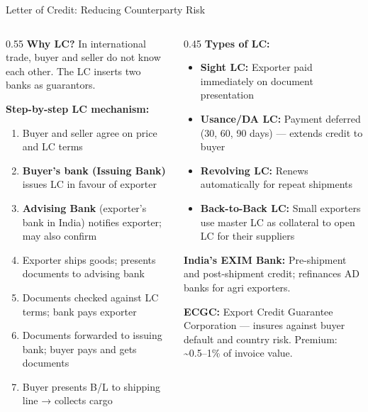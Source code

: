 \documentclass[
  ignorenonframetext,
  aspectratio=169,
]{beamer}
\makeatletter
\providecommand{\tightlist}{%
  \setlength{\itemsep}{0pt}\setlength{\parskip}{0pt}}
\let\quarto@originallabel\label
\DeclareRobustCommand*{\label}[1]{\quarto@originallabel{#1}}
\makeatother
\begin{document}
\begin{frame}
\begin{block}{Letter of Credit: Reducing Counterparty Risk}
\label{letter-of-credit-reducing-counterparty-risk}
\begin{columns}[T]
\begin{column}{0.55\linewidth}
\textbf{Why LC?} In international trade, buyer and seller do not know
each other. The LC inserts two banks as guarantors.

\textbf{Step-by-step LC mechanism:}

\begin{enumerate}
\tightlist
\item
  Buyer and seller agree on price and LC terms
\item
  \textbf{Buyer's bank (Issuing Bank)} issues LC in favour of exporter
\item
  \textbf{Advising Bank} (exporter's bank in India) notifies exporter;
  may also confirm
\item
  Exporter ships goods; presents documents to advising bank
\item
  Documents checked against LC terms; bank pays exporter
\item
  Documents forwarded to issuing bank; buyer pays and gets documents
\item
  Buyer presents B/L to shipping line → collects cargo
\end{enumerate}
\end{column}

\begin{column}{0.45\linewidth}
\textbf{Types of LC:}

\begin{itemize}
\tightlist
\item
  \textbf{Sight LC:} Exporter paid immediately on document presentation
\item
  \textbf{Usance/DA LC:} Payment deferred (30, 60, 90 days) --- extends
  credit to buyer
\item
  \textbf{Revolving LC:} Renews automatically for repeat shipments
\item
  \textbf{Back-to-Back LC:} Small exporters use master LC as collateral
  to open LC for their suppliers
\end{itemize}

\textbf{India's EXIM Bank:} Pre-shipment and post-shipment credit;
refinances AD banks for agri exporters.

\textbf{ECGC:} Export Credit Guarantee Corporation --- insures against
buyer default and country risk. Premium: \textasciitilde0.5--1\% of
invoice value.
\end{column}
\end{columns}
\end{block}
\end{frame}
\end{document}
